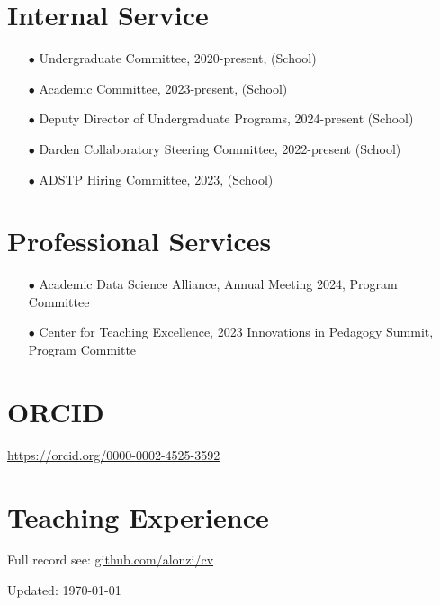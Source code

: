 \documentclass{article}[10pt]
\begin{document}
\section*{Internal Service}

\begin{itemize}
\item [$\bullet$] Undergraduate Committee, 2020-present, (School)
\item [$\bullet$] Academic Committee, 2023-present, (School)
\item [$\bullet$] Deputy Director of Undergraduate Programs, 2024-present (School)
\item [$\bullet$] Darden Collaboratory Steering Committee, 2022-present (School)
\item [$\bullet$] ADSTP Hiring Committee, 2023, (School)
\end{itemize}


\section*{Professional Services}
\begin{itemize}
\item [$\bullet$] Academic Data Science Alliance, Annual Meeting 2024, Program Committee
\item [$\bullet$] Center for Teaching Excellence, 2023 Innovations in Pedagogy Summit, Program Committe
\end{itemize}


\section*{ORCID}
\href{https://orcid.org/0000-0002-4525-3592}{https://orcid.org/0000-0002-4525-3592}




\section*{Teaching Experience}

Full record see: \href{https://github.com/alonzi/cv/blob/master/teaching-record.md}{github.com/alonzi/cv}







\begin{center} Updated: \today \end{center}
\end{document}
